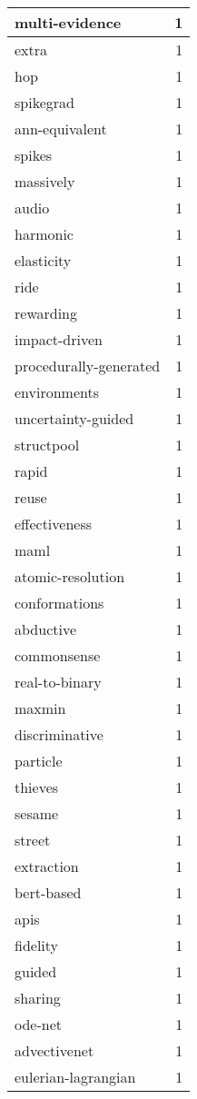 \begin{table}[h]
\begin{tabular}{|l|r|}
\hline
multi-evidence & 1 \\
\hline
extra & 1 \\
\hline
hop & 1 \\
\hline
spikegrad & 1 \\
\hline
ann-equivalent & 1 \\
\hline
spikes & 1 \\
\hline
massively & 1 \\
\hline
audio & 1 \\
\hline
harmonic & 1 \\
\hline
elasticity & 1 \\
\hline
ride & 1 \\
\hline
rewarding & 1 \\
\hline
impact-driven & 1 \\
\hline
procedurally-generated & 1 \\
\hline
environments & 1 \\
\hline
uncertainty-guided & 1 \\
\hline
structpool & 1 \\
\hline
rapid & 1 \\
\hline
reuse & 1 \\
\hline
effectiveness & 1 \\
\hline
maml & 1 \\
\hline
atomic-resolution & 1 \\
\hline
conformations & 1 \\
\hline
abductive & 1 \\
\hline
commonsense & 1 \\
\hline
real-to-binary & 1 \\
\hline
maxmin & 1 \\
\hline
discriminative & 1 \\
\hline
particle & 1 \\
\hline
thieves & 1 \\
\hline
sesame & 1 \\
\hline
street & 1 \\
\hline
extraction & 1 \\
\hline
bert-based & 1 \\
\hline
apis & 1 \\
\hline
fidelity & 1 \\
\hline
guided & 1 \\
\hline
sharing & 1 \\
\hline
ode-net & 1 \\
\hline
advectivenet & 1 \\
\hline
eulerian-lagrangian & 1 \\

\end{tabular}
\end{table}
